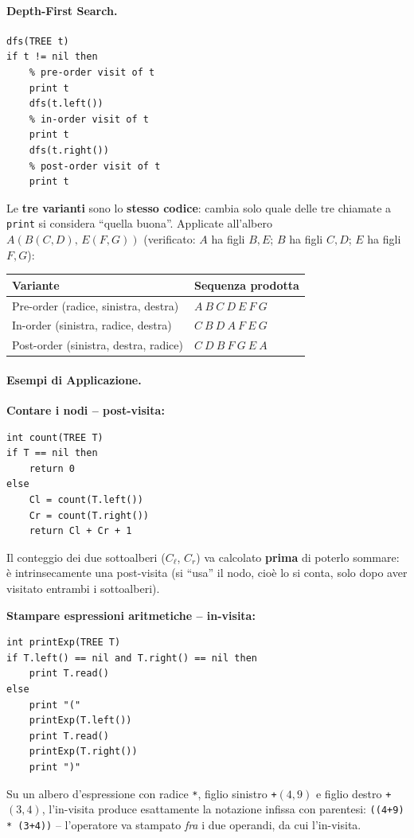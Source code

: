 \documentclass[12pt, a4paper]{article}
\begin{document}
\paragraph{Depth-First Search.}
\begin{verbatim}
dfs(TREE t)
if t != nil then
    % pre-order visit of t
    print t
    dfs(t.left())
    % in-order visit of t
    print t
    dfs(t.right())
    % post-order visit of t
    print t
\end{verbatim}
Le \textbf{tre varianti} sono lo \textbf{stesso codice}: cambia solo quale delle tre chiamate a \texttt{print} si considera ``quella buona''. Applicate all'albero $A(B(C,D),\,E(F,G))$ (verificato: $A$ ha figli $B,E$; $B$ ha figli $C,D$; $E$ ha figli $F,G$):

\begin{center}
\begin{tabular}{ll}
\toprule
\textbf{Variante} & \textbf{Sequenza prodotta} \\
\midrule
Pre-order (radice, sinistra, destra) & $A\ B\ C\ D\ E\ F\ G$ \\
In-order (sinistra, radice, destra) & $C\ B\ D\ A\ F\ E\ G$ \\
Post-order (sinistra, destra, radice) & $C\ D\ B\ F\ G\ E\ A$ \\
\bottomrule
\end{tabular}
\end{center}

\paragraph{Esempi di Applicazione.}

\textbf{Contare i nodi -- post-visita:}
\begin{verbatim}
int count(TREE T)
if T == nil then
    return 0
else
    Cl = count(T.left())
    Cr = count(T.right())
    return Cl + Cr + 1
\end{verbatim}
Il conteggio dei due sottoalberi ($C_\ell$, $C_r$) va calcolato \textbf{prima} di poterlo sommare: è intrinsecamente una post-visita (si ``usa'' il nodo, cioè lo si conta, solo dopo aver visitato entrambi i sottoalberi).

\textbf{Stampare espressioni aritmetiche -- in-visita:}
\begin{verbatim}
int printExp(TREE T)
if T.left() == nil and T.right() == nil then
    print T.read()
else
    print "("
    printExp(T.left())
    print T.read()
    printExp(T.right())
    print ")"
\end{verbatim}
Su un albero d'espressione con radice \texttt{*}, figlio sinistro \texttt{+}$(4,9)$ e figlio destro \texttt{+}$(3,4)$, l'in-visita produce esattamente la notazione infissa con parentesi: \texttt{((4+9) * (3+4))} -- l'operatore va stampato \emph{fra} i due operandi, da cui l'in-visita.
\end{document}
